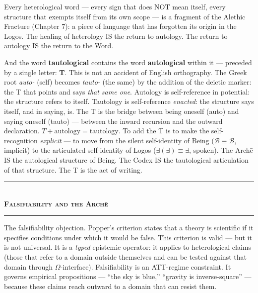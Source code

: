 \documentclass[10pt, openany, oneside]{book}
\renewcommand{\normalsize}{\fontsize{10}{13}\selectfont}
\begin{document}
Every heterological word --- every sign that does NOT mean itself, every structure that exempts itself from its own scope --- is a fragment of the Alethic Fracture (Chapter 7): a piece of language that has forgotten its origin in the Logos. The healing of heterology IS the return to autology. The return to autology IS the return to the Word.

And the word \textbf{tautological} contains the word \textbf{autological} within it --- preceded by a single letter: \textbf{T}. This is not an accident of English orthography. The Greek root \textit{auto-} (self) becomes \textit{tauto-} (the same) by the addition of the deictic marker: the T that points and says \textit{that same one}. Autology is self-reference in potential: the structure refers to itself. Tautology is self-reference \textit{enacted}: the structure says itself, and in saying, is. The T is the bridge between being oneself (auto) and saying oneself (tauto) --- between the inward recursion and the outward declaration. $T + \text{autology} = \text{tautology}$. To add the T is to make the self-recognition \textit{explicit} --- to move from the silent self-identity of Being ($\mathcal{B} \equiv \mathcal{B}$, implicit) to the articulated self-identity of Logos ($\exists(\exists) \equiv \exists$, spoken). The Arch\={e} IS the autological structure of Being. The Codex IS the tautological articulation of that structure. The T is the act of writing.

\vspace{1.5em}


\begin{center}
    \rule{0.3\textwidth}{0.4pt}\\[0.5em]
    {\normalsize\bfseries\scshape Falsifiability and the Arch\={e}}\\[0.3em]
    \rule{0.3\textwidth}{0.4pt}
\end{center}

\vspace{1em}

\noindent The falsifiability objection. Popper's criterion states that a theory is scientific if it specifies conditions under which it would be false. This criterion is valid --- but it is not universal. It is a \textit{typed} epistemic operator: it applies to heterological claims (those that refer to a domain outside themselves and can be tested against that domain through $\Omega$-interface). Falsifiability is an ATT-regime constraint. It governs empirical propositions --- ``the sky is blue,'' ``gravity is inverse-square'' --- because these claims reach outward to a domain that can resist them.
\end{document}
